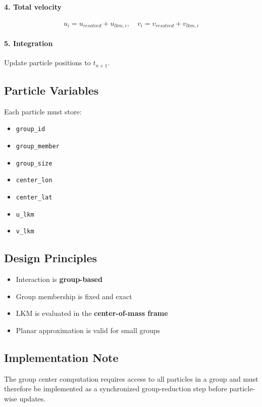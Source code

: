 \documentclass[11pt,a4paper]{article}
\begin{document}
	\paragraph{4. Total velocity}
	\[
	u_i = u_{resolved} + u_{lkm,i}, \quad
	v_i = v_{resolved} + v_{lkm,i}
	\]
	
	\paragraph{5. Integration}
	Update particle positions to $t_{n+1}$.
	
	\subsection{Particle Variables}
	
	Each particle must store:
	\begin{itemize}
		\item \texttt{group\_id}
		\item \texttt{group\_member}
		\item \texttt{group\_size}
		\item \texttt{center\_lon}
		\item \texttt{center\_lat}
		\item \texttt{u\_lkm}
		\item \texttt{v\_lkm}
	\end{itemize}
	
	\subsection{Design Principles}
	
	\begin{itemize}
		\item Interaction is \textbf{group-based}
		\item Group membership is fixed and exact
		\item LKM is evaluated in the \textbf{center-of-mass frame}
		\item Planar approximation is valid for small groups
	\end{itemize}
	
	\subsection{Implementation Note}
	
	The group center computation requires access to all particles in a group and must
	therefore be implemented as a synchronized group-reduction step before particle-wise updates.
	
\end{document}
